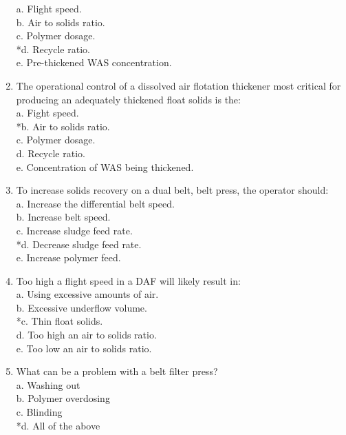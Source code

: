\documentclass{article}
\begin{document}
\begin{enumerate}
a. Flight speed. \\
b. Air to solids ratio. \\
c. Polymer dosage. \\
*d. Recycle ratio. \\
e. Pre-thickened WAS concentration. \\

\item  The operational control of a dissolved air flotation thickener most critical for producing an adequately thickened float solids is the: \\

a. Fight speed. \\
*b. Air to solids ratio. \\
c. Polymer dosage. \\
d. Recycle ratio. \\
e. Concentration of WAS being thickened. \\

\item  To increase solids recovery on a dual belt, belt press, the operator should: \\

a. Increase the differential belt speed. \\
b. Increase belt speed. \\
c. Increase sludge feed rate. \\
*d. Decrease sludge feed rate. \\
e. Increase polymer feed. \\

\item  Too high a flight speed in a DAF will likely result in: \\

a. Using excessive amounts of air. \\
b. Excessive underflow volume. \\
*c. Thin float solids. \\
d. Too high an air to solids ratio. \\
e. Too low an air to solids ratio. \\

\item  What can be a problem with a belt filter press? \\

a. Washing out \\
b. Polymer overdosing \\
c. Blinding \\
*d. All of the above \\


\end{enumerate}
\end{document}

